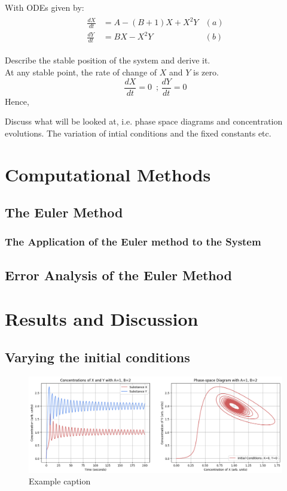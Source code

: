 \documentclass[reprint, amsmath, amssymb, aps]{revtex4-2}
\begin{document}
With ODEs given by:
\begin{align}
	\begin{aligned}
	\frac{dX}{dt} &= A - (B + 1)X + X^2 Y & (a)\\
	\frac{dY}{dt} &= BX - X^2 Y & (b)
	\end{aligned}
\end{align}


Describe the stable position of the system and derive it.\\

At any stable point, the rate of change of $X$ and $Y$ is zero.
\begin{equation}
	\frac{dX}{dt}=0\,\text{  ;  }\frac{dY}{dt}=0
\end{equation}Hence,


Discuss what will be looked at, i.e. phase space diagrams and concentration evolutions. The variation of intial conditions and the fixed constants etc.\\

\section{Computational Methods}

\subsection{The Euler Method}

\subsubsection{The Application of the Euler method to the System}

\subsection{Error Analysis of the Euler Method}

\section{Results and Discussion}

\subsection{Varying the initial conditions}

\begin{figure}
\includegraphics[width=2\columnwidth]{combinedPlot.png}
\caption{\label{fig:combinedPlot}Example caption}
\end{figure}
\end{document}

